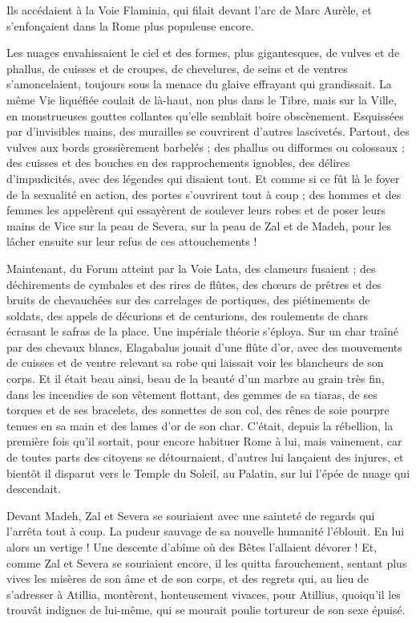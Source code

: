 \documentclass[a4paper, 11pt, oneside, polutonikogreek, french]{article}
\begin{document}
Ils accédaient à la Voie Flaminia, qui filait devant l'arc de Marc Aurèle, et s'enfonçaient dans la Rome plus populeuse encore.

Les nuages envahissaient le ciel et des formes, plus gigantesques, de vulves et de phallus, de cuisses et de croupes, de chevelures, de seins et de ventres s'amoncelaient, toujours sous la menace du glaive effrayant qui grandissait. La même Vie liquéfiée coulait de là-haut, non plus dans le Tibre, mais sur la Ville, en monstrueuses gouttes collantes qu'elle semblait boire obscènement. Esquissées par d'invisibles mains, des murailles se couvrirent d'autres lascivetés. Partout, des vulves aux bords grossièrement barbelés ; des phallus ou difformes ou colossaux ; des cuisses et des bouches en des rapprochements ignobles, des délires d'impudicités, avec des légendes qui disaient tout. Et comme si ce fût là le foyer de la sexualité en action, des portes s'ouvrirent tout à coup ; des hommes et des femmes les appelèrent qui essayèrent de soulever leurs robes et de poser leurs mains de Vice sur la peau de Severa, sur la peau de Zal et de Madeh, pour les lâcher ensuite sur leur refus de ces attouchements !

Maintenant, du Forum atteint par la Voie Lata, des clameurs fusaient ; des déchirements de cymbales et des rires de flûtes, des chœurs de prêtres et des bruits de chevauchées sur des carrelages de portiques, des piétinements de soldats, des appels de décurions et de centurions, des roulements de chars écrasant le safras de la place. Une impériale théorie s'éploya. Sur un char traîné par des chevaux blancs, Elagabalus jouait d'une flûte d'or, avec des mouvements de cuisses et de ventre relevant sa robe qui laissait voir les blancheurs de son corps. Et il était beau ainsi, beau de la beauté d'un marbre au grain très fin, dans les incendies de son vêtement flottant, des gemmes de sa tiaras, de ses torques et de ses bracelets, des sonnettes de son col, des rênes de soie pourpre tenues en sa main et des lames d'or de son char. C'était, depuis la rébellion, la première fois qu'il sortait, pour encore habituer Rome à lui, mais vainement, car de toutes parts des citoyens se détournaient, d'autres lui lançaient des injures, et bientôt il disparut vers le Temple du Soleil, au Palatin, sur lui l'épée de nuage qui descendait.

Devant Madeh, Zal et Severa se souriaient avec une sainteté de regards qui l'arrêta tout à coup. La pudeur sauvage de sa nouvelle humanité l'éblouit. En lui alors un vertige ! Une descente d'abîme où des Bêtes l'allaient dévorer ! Et, comme Zal et Severa se souriaient encore, il les quitta farouchement, sentant plus vives les misères de son âme et de son corps, et des regrets qui, au lieu de s'adresser à Atillia, montèrent, honteusement vivaces, pour Atillius, quoiqu'il les trouvât indignes de lui-même, qui se mourait poulie tortureur de son sexe épuisé.
\clearpage
\end{document}
